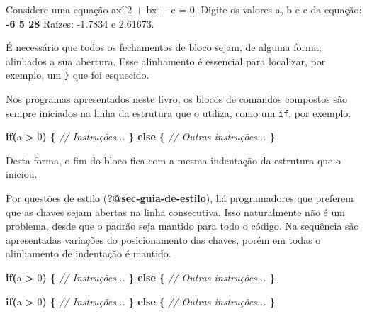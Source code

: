 \documentclass[
  11pt,
  a4paper,
]{scrbook}
\newenvironment{Shaded}{\begin{snugshade}}{\end{snugshade}}
\newcommand{\CommentTok}[1]{\textcolor[rgb]{0.56,0.35,0.01}{\textit{#1}}}
\newcommand{\ControlFlowTok}[1]{\textcolor[rgb]{0.13,0.29,0.53}{\textbf{#1}}}
\newcommand{\DecValTok}[1]{\textcolor[rgb]{0.00,0.00,0.81}{#1}}
\newcommand{\KeywordTok}[1]{\textcolor[rgb]{0.13,0.29,0.53}{\textbf{#1}}}
\newcommand{\NormalTok}[1]{#1}
\newcommand{\OperatorTok}[1]{\textcolor[rgb]{0.81,0.36,0.00}{\textbf{#1}}}
\begin{document}
\begin{Shaded}
\begin{Highlighting}[]
\NormalTok{Considere uma equação ax\^{}2 + bx + c = 0.}
\NormalTok{Digite os valores a, b e c da equação: }\KeywordTok{ {-}6 5 28 }
\NormalTok{Raízes: {-}1.7834 e 2.61673.}
\end{Highlighting}
\end{Shaded}

É necessário que todos os fechamentos de bloco sejam, de alguma forma,
alinhados a sua abertura. Esse alinhamento é essencial para localizar,
por exemplo, um \texttt{\}} que foi esquecido.

Nos programas apresentados neste livro, os blocos de comandos compostos
são sempre iniciados na linha da estrutura que o utiliza, como um
\texttt{if}, por exemplo.

\begin{Shaded}
\begin{Highlighting}[]
\ControlFlowTok{if}\OperatorTok{(}\NormalTok{a }\OperatorTok{\textgreater{}} \DecValTok{0}\OperatorTok{)} \OperatorTok{\{}
    \CommentTok{// Instruções...}
\OperatorTok{\}}
\ControlFlowTok{else} \OperatorTok{\{}
    \CommentTok{// Outras instruções...}
\OperatorTok{\}}
\end{Highlighting}
\end{Shaded}

Desta forma, o fim do bloco fica com a mesma indentação da estrutura que
o iniciou.

Por questões de estilo (\textbf{?@sec-guia-de-estilo}), há programadores
que preferem que as chaves sejam abertas na linha consecutiva. Isso
naturalmente não é um problema, desde que o padrão seja mantido para
todo o código. Na sequência são apresentadas variações do posicionamento
das chaves, porém em todas o alinhamento de indentação é mantido.

\begin{Shaded}
\begin{Highlighting}[]
\ControlFlowTok{if}\OperatorTok{(}\NormalTok{a }\OperatorTok{\textgreater{}} \DecValTok{0}\OperatorTok{)}
\OperatorTok{\{}
    \CommentTok{// Instruções...}
\OperatorTok{\}}
\ControlFlowTok{else}
\OperatorTok{\{}
    \CommentTok{// Outras instruções...}
\OperatorTok{\}}
\end{Highlighting}
\end{Shaded}

\begin{Shaded}
\begin{Highlighting}[]
\ControlFlowTok{if}\OperatorTok{(}\NormalTok{a }\OperatorTok{\textgreater{}} \DecValTok{0}\OperatorTok{)} \OperatorTok{\{}
    \CommentTok{// Instruções...}
\OperatorTok{\}} \ControlFlowTok{else} \OperatorTok{\{}
    \CommentTok{// Outras instruções...}
\OperatorTok{\}}
\end{Highlighting}
\end{Shaded}
\end{document}
